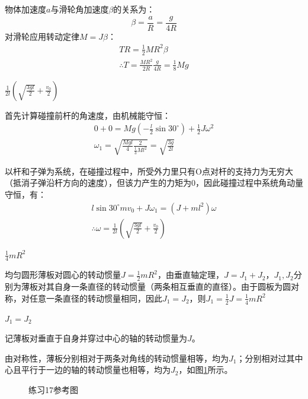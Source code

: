 \documentclass[b5paper,opensource,sourcefont,parskip]{qyxf-book}
\begin{document}
\solve 物体加速度$ a $与滑轮角加速度$ \beta $的关系为：
\[\beta=\frac{a}{R}=\frac{g}{4R}\]
对滑轮应用转动定律$M=J\beta$：
\begin{gather*}
TR=\frac{1}{2}MR^2\beta\\
\therefore T=\frac{MR^2}{2R}\frac{g}{4R}=\frac{1}{8}Mg
\end{gather*}

$\frac{1}{2l}\left(\sqrt{\frac{3gl}{2}}+\frac{v_0}{2}\right)$

\solve 首先计算碰撞前杆的角速度，由机械能守恒：
\begin{gather*}
0+0=Mg(-\frac{l}{2}\sin 30^\circ)+\frac{1}{2}J\omega^2\\
\omega_1=\sqrt{\frac{Mgl}{4}\frac{2}{\frac{1}{3}Ml^2}}=\sqrt{\frac{3g}{2l}}
\end{gather*}

以杆和子弹为系统，在碰撞过程中，所受外力里只有O点对杆的支持力为无穷大（抵消子弹沿杆方向的速度），但该力产生的力矩为0，因此碰撞过程中系统角动量守恒，有：
\begin{gather*}
l\sin 30^\circ mv_0+J\omega_1=(J+ml^2)\omega\\
\therefore \omega=\frac{1}{2l}\left(\sqrt{\frac{3gl}{2}}+\frac{v_0}{2}\right)
\end{gather*}

$\frac{1}{4}mR^2$

\solve 均匀圆形薄板对圆心的转动惯量$ J=\frac{1}{2}mR^2 $，由垂直轴定理，$ J=J_1+J_2 $，$ J_1,J_2 $分别为薄板对其自身一条直径的转动惯量（两条相互垂直的直径）。由于圆板为圆对称，对任意一条直径的转动惯量相同，因此$ J_1=J_2 $，则$ J_1=\frac{1}{2}J=\frac{1}{4}mR^2 $

$J_1=J_2$

\solve 记薄板对垂直于自身并穿过中心的轴的转动惯量为$ J $。

由对称性，薄板分别相对于两条对角线的转动惯量相等，均为$J_1$；分别相对过其中心且平行于一边的轴的转动惯量也相等，均为$J_2$，如图\ref{fig:c4-t17}所示。

\begin{figure}[htbp]
	\centering
	\caption{练习17参考图}\label{fig:c4-t17}
\end{figure}
\end{document}
